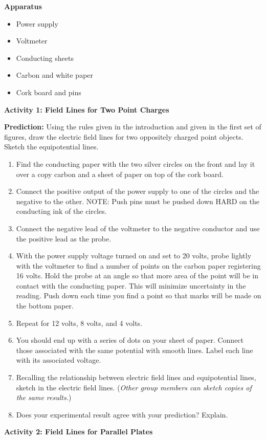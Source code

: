 \textbf{Apparatus}

\begin{itemize}
\item Power supply
\item Voltmeter
\item Conducting sheets
\item Carbon and white paper
\item Cork board and pins
\end{itemize}
\textbf{Activity 1: Field Lines for Two Point Charges}

\textbf{Prediction:} Using the rules given in the introduction and
given in the first set of figures, draw the electric field lines for two
oppositely charged point objects. Sketch the equipotential lines.
\vspace{1in}

\begin{enumerate}
\item Find the conducting paper with the two silver circles on the front
and lay it over a copy carbon and a sheet of paper on top of the cork
board.
\item Connect the positive output of the power supply to one of the circles
and the negative to the other. NOTE: Push pins must be pushed down HARD on the 
conducting ink of the circles.
\item Connect the negative lead of the voltmeter to the negative conductor
and use the positive lead as the probe. 
\item With the power supply voltage turned on and set to 20 volts, probe
lightly with the voltmeter to find a number of points on the carbon
paper registering 16 volts. Hold the probe at an angle so that more area of the 
point will be in contact with the conducting paper. This will minimize 
uncertainty in the reading. Push down each time you find a point so
that marks will be made on the bottom paper.
\item Repeat for 12 volts, 8 volts, and 4 volts.
\item You should end up with a series of dots on your sheet of paper. Connect
those associated with the same potential with smooth lines. Label each line 
with its associated voltage.
\item Recalling the relationship between electric field lines and equipotential
lines, sketch in the electric field lines. (\emph{Other group members
can sketch copies of the same results.})
\item Does your experimental result agree with your prediction? Explain.
\vspace{15mm}

\end{enumerate}
\textbf{Activity 2: Field Lines for Parallel Plates}

